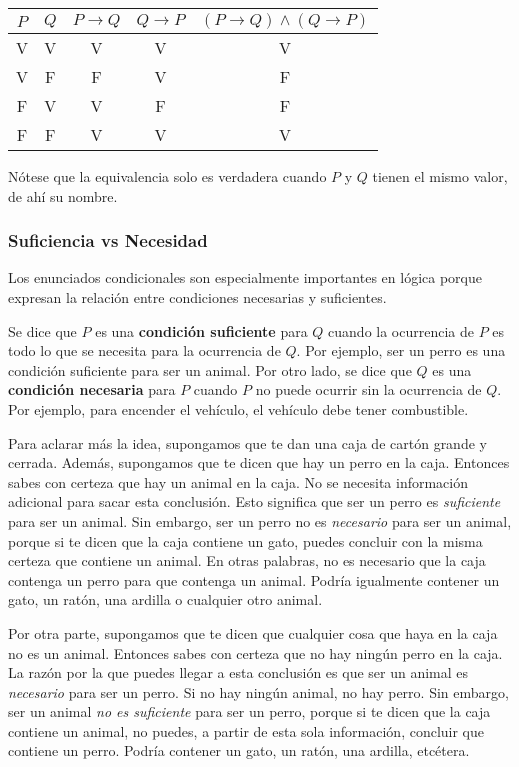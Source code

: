 \begin{center}
    \begin{tabular}{c|c|c|c|c}
        $P$ & $Q$ & $P \rightarrow Q$ & $Q \rightarrow P$ & $(P \rightarrow Q) \wedge (Q \rightarrow P)$ \\
        \hline
        V & V & V & V & V \\
        V & F & F & V & F \\
        F & V & V & F & F\\
        F & F & V & V & V
    \end{tabular}
    \label{tab:equivalencia-tabla}
\end{center}

Nótese que la equivalencia solo es verdadera cuando $P$ y $Q$ tienen el mismo valor, de ahí su nombre.


\subsubsection{Suficiencia vs Necesidad}

Los enunciados condicionales son especialmente importantes en lógica porque expresan la relación entre condiciones necesarias y suficientes. 

Se dice que $P$ es una \textbf{condición suficiente} para $Q$ cuando la ocurrencia de $P$ es todo lo que se necesita para la ocurrencia de $Q$. Por ejemplo, ser un perro es una condición suficiente para ser un animal.  Por otro lado, se dice que $Q$ es una \textbf{condición necesaria} para $P$ cuando $P$ no puede ocurrir sin la ocurrencia de $Q$. Por ejemplo, para encender el vehículo, el vehículo debe tener combustible.

Para aclarar más la idea, supongamos que te dan una caja de cartón grande y cerrada. Además, supongamos que te dicen que hay un perro en la caja. Entonces sabes con certeza que hay un animal en la caja. No se necesita información adicional para sacar esta conclusión. Esto significa que ser un perro es \textit{suficiente} para ser un animal. Sin embargo, ser un perro no es \textit{necesario} para ser un animal, porque si te dicen que la caja contiene un gato, puedes concluir con la misma certeza que contiene un animal. En otras palabras, no es necesario que la caja contenga un perro para que contenga un animal. Podría igualmente contener un gato, un ratón, una ardilla o cualquier otro animal.

Por otra parte, supongamos que te dicen que cualquier cosa que haya en la caja no es un animal. Entonces sabes con certeza que no hay ningún perro en la caja. La razón por la que puedes llegar a esta conclusión es que ser un animal es \textit{necesario} para ser un perro. Si no hay ningún animal, no hay perro. Sin embargo, ser un animal \textit{no es suficiente} para ser un perro, porque si te dicen que la caja contiene un animal, no puedes, a partir de esta sola información, concluir que contiene un perro. Podría contener un gato, un ratón, una ardilla, etcétera.

